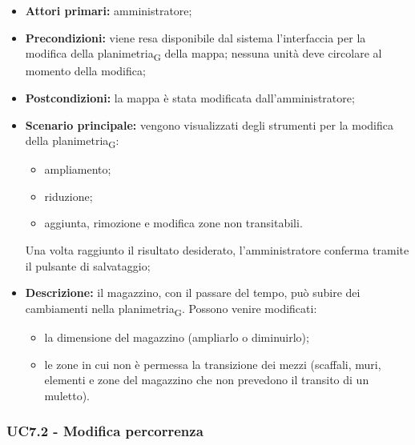 \begin{itemize}

  \item   \textbf{Attori primari:} amministratore;

  \item   \textbf{Precondizioni:} viene resa disponibile dal sistema l'interfaccia per la modifica della planimetria\textsubscript{G} della mappa; nessuna unità deve circolare al momento della modifica;

 \item   \textbf{Postcondizioni:} la mappa è stata modificata dall'amministratore;

 \item   \textbf{Scenario principale:} vengono visualizzati degli strumenti per la modifica della planimetria\textsubscript{G}:

 \begin{itemize}

      \item ampliamento;

    \item riduzione;
      \item aggiunta, rimozione e modifica zone non transitabili.

  \end{itemize}

  Una volta raggiunto il risultato desiderato, l'amministratore conferma tramite il pulsante di salvataggio;

  \item   \textbf{Descrizione:} il magazzino, con il passare del tempo, può subire dei cambiamenti nella planimetria\textsubscript{G}. Possono venire modificati:

\begin{itemize}

     \item la dimensione del magazzino (ampliarlo o diminuirlo);
     \item le zone in cui non è permessa la transizione dei mezzi (scaffali, muri, elementi e zone del magazzino che non prevedono il transito di un muletto).

  \end{itemize}

\end{itemize}



\subsubsection{UC7.2 - Modifica percorrenza}

